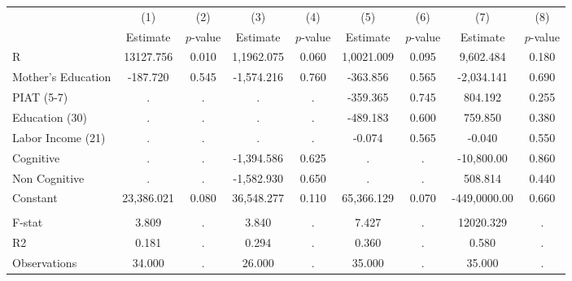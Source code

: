 \begin{tabular}{lcccccccc} \toprule
 & (1) & (2) & (3) & (4) & (5) & (6) & (7) & (8) \\ 
 & Estimate  & $p$-value  & Estimate  & $p$-value  & Estimate  & $p$-value  & Estimate  & $p$-value  \\  \midrule
R & 13127.756 &     0.010 & 1,1962.075 &     0.060 & 1,0021.009 &     0.095 &  9,602.484 &     0.180 \\  
Mother's Education &  -187.720 &     0.545 & -1,574.216 &     0.760 &  -363.856 &     0.565 & -2,034.141 &     0.690 \\  
PIAT (5-7) &         . &         . &         . &         . &  -359.365 &     0.745 &   804.192 &     0.255 \\  
Education (30) &         . &         . &         . &         . &  -489.183 &     0.600 &   759.850 &     0.380 \\  
Labor Income (21) &         . &         . &         . &         . &    -0.074 &     0.565 &    -0.040 &     0.550 \\  
Cognitive &         . &         . & -1,394.586 &     0.625 &         . &         . & -10,800.00 &     0.860 \\  
Non Cognitive &         . &         . & -1,582.930 &     0.650 &         . &         . &   508.814 &     0.440 \\  
Constant & 23,386.021 &     0.080 & 36,548.277 &     0.110 & 65,366.129 &     0.070 & -449,0000.00 &     0.660 \\   \\ \midrule
F-stat &     3.809 &         . &     3.840 &         . &     7.427 &         . & 12020.329 &         . \\ 
R2 &     0.181 &         . &     0.294 &         . &     0.360 &         . &     0.580 &         . \\  
Observations &    34.000 &         . &    26.000 &         . &    35.000 &         . &    35.000 &         . \\  
\bottomrule \end{tabular}
